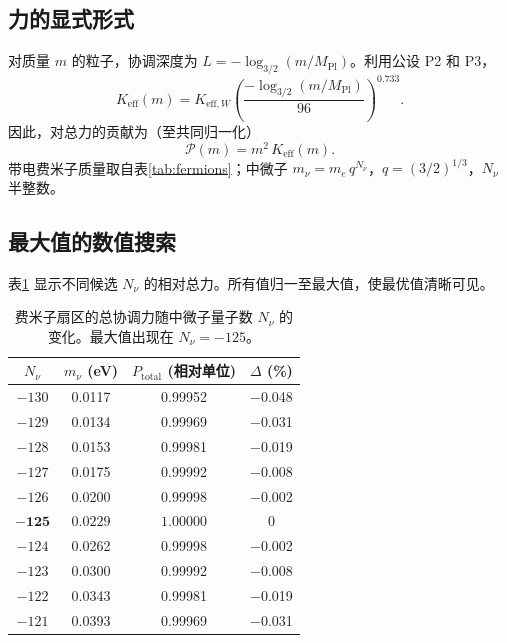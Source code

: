 \documentclass[12pt,a4paper]{article}
\begin{document}
	\subsection{力的显式形式}
	
	对质量 \(m\) 的粒子，协调深度为 \(L = -\log_{3/2}(m/M_{\mathrm{Pl}})\)。利用公设 P2 和 P3，
	\begin{equation}
		K_{\mathrm{eff}}(m) = K_{\mathrm{eff},W} \left( \frac{-\log_{3/2}(m/M_{\mathrm{Pl}})}{96} \right)^{0.733}.
	\end{equation}
	因此，对总力的贡献为（至共同归一化）
	\begin{equation}
		\mathcal{P}(m) = m^2 \, K_{\mathrm{eff}}(m).
	\end{equation}
	带电费米子质量取自表\ref{tab:fermions}；中微子 \(m_{\nu} = m_e \, q^{N_{\nu}}\)，\(q=(3/2)^{1/3}\)，\(N_{\nu}\) 半整数。
	
	\subsection{最大值的数值搜索}
	
	表\ref{tab:power} 显示不同候选 \(N_{\nu}\) 的相对总力。所有值归一至最大值，使最优值清晰可见。
	
	\begin{table}[H]
		\centering
		\caption{费米子扇区的总协调力随中微子量子数 \(N_{\nu}\) 的变化。最大值出现在 \(N_{\nu}=-125\)。}
		\label{tab:power}
		\small
		\begin{tabular}{c c c c}
			\toprule
			\(N_{\nu}\) & \(m_{\nu}\) (eV) & \(P_{\mathrm{total}}\) (相对单位) & \(\Delta\) (\%) \\
			\midrule
			\(-130\) & 0.0117 & 0.99952 & $-$0.048 \\
			\(-129\) & 0.0134 & 0.99969 & $-$0.031 \\
			\(-128\) & 0.0153 & 0.99981 & $-$0.019 \\
			\(-127\) & 0.0175 & 0.99992 & $-$0.008 \\
			\(-126\) & 0.0200 & 0.99998 & $-$0.002 \\
			$\mathbf{-125}$ & $\mathbf{0.0229}$ & $\mathbf{1.00000}$ & 0 \\
			\(-124\) & 0.0262 & 0.99998 & $-$0.002 \\
			\(-123\) & 0.0300 & 0.99992 & $-$0.008 \\
			\(-122\) & 0.0343 & 0.99981 & $-$0.019 \\
			\(-121\) & 0.0393 & 0.99969 & $-$0.031 \\
			\bottomrule
		\end{tabular}
	\end{table}
	
\end{document}
